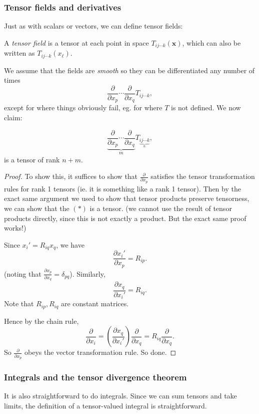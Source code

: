 \documentclass[a4paper]{article}
\begin{document}
\subsubsection*{Tensor fields and derivatives}
Just as with scalars or vectors, we can define tensor fields:
\begin{defi}
  A \emph{tensor field} is a tensor at each point in space $T_{ij\cdots k}(\mathbf{x})$, which can also be written as $T_{ij\cdots k}(x_\ell)$.
\end{defi}

We assume that the fields are \emph{smooth} so they can be differentiated any number of times
\[
  \frac{\partial}{\partial x_p}\cdots \frac{\partial}{\partial x_q}T_{ij\cdots k},
\]
except for where things obviously fail, eg. for where $T$ is not defined. We now claim:
\begin{prop}
  \[
    \underbrace{\frac{\partial}{\partial x_p}\cdots \frac{\partial}{\partial x_q}}_{m}T_{\underbrace{ij\cdots k}_n},\tag{$*$}
  \]
  is a tensor of rank $n + m$.
\end{prop}
\begin{proof}
  To show this, it suffices to show that $\frac{\partial}{\partial x_p}$ satisfies the tensor transformation rules for rank 1 tensors (ie. it is something like a rank 1 tensor). Then by the exact same argument we used to show that tensor products preserve tensorness, we can show that the $(*)$ is a tensor. (we cannot use the result of tensor products directly, since this is not exactly a product. But the exact same proof works!)

  Since $x_i' = R_{iq}x_q$, we have
  \[
    \frac{\partial x_i'}{\partial x_p} = R_{ip}.
  \]
  (noting that $\frac{\partial x_p}{\partial x_q} = \delta_{pq}$). Similarly,
  \[
    \frac{\partial x_q}{\partial x_i'} = R_{iq}.
  \]
  Note that $R_{ip}, R_{iq}$ are constant matrices.

  Hence by the chain rule,
  \[
    \frac{\partial}{\partial x_i} = \left(\frac{\partial x_q}{\partial x_i'}\right)\frac{\partial}{\partial x_q} = R_{iq} \frac{\partial}{\partial x_q}.
  \]
  So $\frac{\partial}{\partial x_p}$ obeys the vector transformation rule. So done.
\end{proof}
\subsubsection*{Integrals and the tensor divergence theorem}
It is also straightforward to do integrals. Since we can sum tensors and take limits, the definition of a tensor-valued integral is straightforward.
\end{document}

